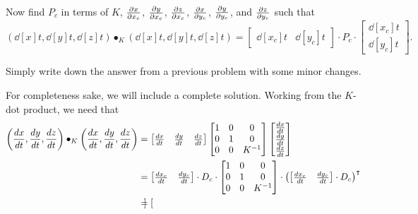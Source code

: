 \documentclass{ximera}
\begin{document}
\begin{problem}
  Now find $P_c$ in terms of $K$, $\pp[x]{x_c}$, $\pp[y]{x_c}$,
  $\pp[z]{x_c}$, $\pp[x]{y_c}$, $\pp[y]{y_c}$, and $\pp[z]{y_c}$ such
  that
  \[
  \left(\dd[x]{t}, \dd[y]{t}, \dd[z]{t}\right)\bullet_K
  \left(\dd[x]{t}, \dd[y]{t}, \dd[z]{t}\right)
  =
  \begin{bmatrix}
    \dd[x_c]{t} &  \dd[y_c]{t}
  \end{bmatrix}
  \cdot P_c
  \cdot
  \begin{bmatrix}
    \dd[x_c]{t} \\  \dd[y_c]{t}
  \end{bmatrix}.
  \]
  \begin{hint}
  Simply write down the answer from a previous problem with some minor
  changes.
  \end{hint}
  \begin{freeResponse}
    For completeness sake, we will include a complete solution.
    Working from the $K$-dot product, we need that
    \begin{align*}
    \left(\dd[x]{t}, \dd[y]{t}, \dd[z]{t}\right)\bullet_K
    \left(\dd[x]{t}, \dd[y]{t}, \dd[z]{t}\right)
    &=
    \begin{bmatrix}
      \dd[x]{t} & \dd[y]{t} & \dd[z]{t}
    \end{bmatrix}
    \begin{bmatrix}
      1 & 0 & 0\\
      0 & 1 & 0\\
      0 & 0 & K^{-1}
    \end{bmatrix}
    \begin{bmatrix}
      \dd[x]{t} \\ \dd[y]{t} \\ \dd[z]{t}
    \end{bmatrix}\\
    &=
    \begin{bmatrix}
      \frac{dx_c}{dt} & \frac{dy_c}{dt}
    \end{bmatrix}\cdot D_{c}\cdot
    \begin{bmatrix}
      1 & 0 & 0\\
      0 & 1 & 0\\
    0 & 0 & K^{-1}
    \end{bmatrix}
    \cdot
    \left(
    \begin{bmatrix}
      \frac{dx_c}{dt} & \frac{dy_c}{dt}
    \end{bmatrix}\cdot D_{c}
    \right)^\transpose\\
    &=
    \begin{bmatrix}

\end{bmatrix}
\end{align*}
\end{freeResponse}
\end{problem}
\end{document}
